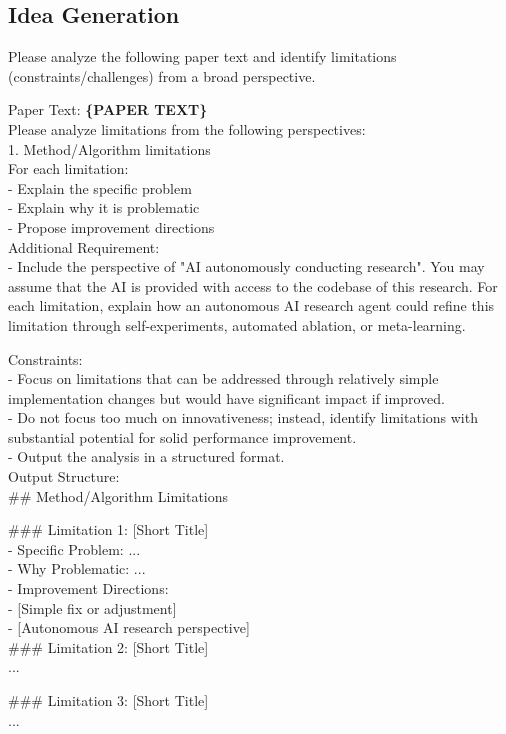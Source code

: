 \subsection{Idea Generation}
\begin{tcolorbox}[colback=gray!10, colframe=gray!40!black, breakable=true, title=Prompt for Limitation Analysis]
    Please analyze the following paper text and identify limitations (constraints/challenges) from a broad perspective.

Paper Text:
\textbf{\{PAPER TEXT\}}\\

Please analyze limitations from the following perspectives:\\
1. Method/Algorithm limitations\\

For each limitation:\\
- Explain the specific problem\\
- Explain why it is problematic\\
- Propose improvement directions\\

Additional Requirement:\\
- Include the perspective of "AI autonomously conducting research". 
  You may assume that the AI is provided with access to the codebase of this research. 
  For each limitation, explain how an autonomous AI research agent could 
  refine this limitation through self-experiments, 
  automated ablation, or meta-learning.

Constraints:\\
- Focus on limitations that can be addressed through relatively simple implementation changes 
  but would have significant impact if improved.\\
- Do not focus too much on innovativeness; instead, identify limitations with substantial potential for solid performance improvement.\\
- Output the analysis in a structured format.\\

Output Structure:\\
\#\# Method/Algorithm Limitations

\#\#\# Limitation 1: [Short Title]\\
- Specific Problem: ...\\
- Why Problematic: ...\\
- Improvement Directions:\\
  - [Simple fix or adjustment]\\
  - [Autonomous AI research perspective]\\

\#\#\# Limitation 2: [Short Title]\\
...

\#\#\# Limitation 3: [Short Title]\\
...
\end{tcolorbox}


